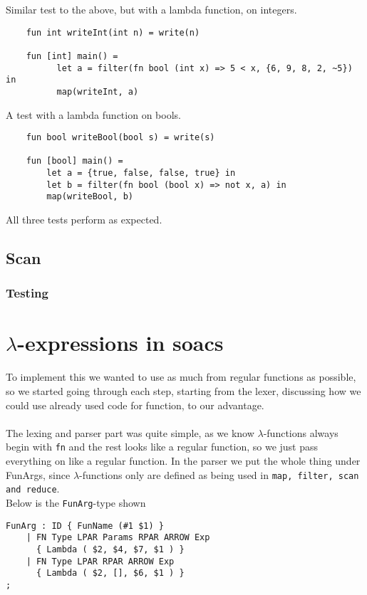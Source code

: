 \documentclass[paper=a4, fontsize=11pt]{scrartcl} %
\numberwithin{equation}{section} %
\numberwithin{figure}{section} %
\numberwithin{table}{section} %
\begin{document}
	Similar test to the above, but with a lambda function, on integers.
	\begin{lstlisting}
	fun int writeInt(int n) = write(n)

	fun [int] main() =
		  let a = filter(fn bool (int x) => 5 < x, {6, 9, 8, 2, ~5}) in
		  map(writeInt, a)
	\end{lstlisting}

	A test with a lambda function on bools.
	\begin{lstlisting}
	fun bool writeBool(bool s) = write(s)

	fun [bool] main() =
		let a = {true, false, false, true} in
		let b = filter(fn bool (bool x) => not x, a) in
		map(writeBool, b)
	\end{lstlisting}

	All three tests perform as expected.
\subsection{Scan}

\subsubsection{Testing}

\section{$\lambda$-expressions in soacs}

To implement this we wanted to use as much from regular functions as possible, so we started going through each step, starting from the lexer, discussing how we could use already used code for function, to our advantage.\\\\
The lexing and parser part was quite simple, as we know $\lambda$-functions always begin with \verb"fn" and the rest looks like a regular function, so we just pass everything on like a regular function. In the parser we put the whole thing under FunArgs, since $\lambda$-functions only are defined as being used in \verb"map, filter, scan and reduce".\\
Below is the \verb"FunArg"-type shown
\begin{lstlisting}
FunArg : ID { FunName (#1 $1) }
    | FN Type LPAR Params RPAR ARROW Exp
      { Lambda ( $2, $4, $7, $1 ) }
    | FN Type LPAR RPAR ARROW Exp
      { Lambda ( $2, [], $6, $1 ) }
;
\end{lstlisting}
\end{document}
